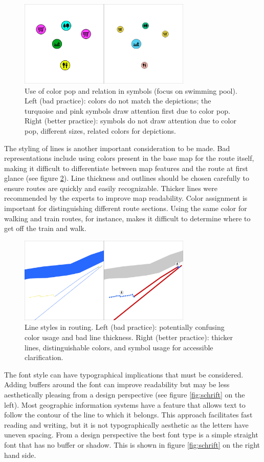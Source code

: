 \documentclass[agile, final]{copernicus-agile}
\begin{document}
\begin{figure}[ht]
  \includegraphics[width=8.2cm]{figures/symbole.png}
\caption{Use of color pop and relation in symbols (focus on swimming pool). Left (bad practice): colors do not match the depictions; the turquoise and pink symbols draw attention first due to color pop. Right (better practice): symbols do not draw attention due to color pop, different sizes, related colors for depictions.}
\label{fig:symbole}
\end{figure}

The styling of lines is another important consideration to be made. Bad representations include using colors present in the base map for the route itself, making it difficult to differentiate between map features and the route at first glance (see figure \ref{fig:linien_farbe}). Line thickness and outlines should be chosen carefully to ensure routes are quickly and easily recognizable. Thicker lines were recommended by the experts to improve map readability. Color assignment is important for distinguishing different route sections. Using the same color for walking and train routes, for instance, makes it difficult to determine where to get off the train and walk. 

\begin{figure}[ht]
  \includegraphics[width=8.2cm]{figures/linien_farbe.png}
\caption{Line styles in routing. Left (bad practice): potentially confusing color usage and bad line thickness. Right (better practice): thicker lines, distinguishable colors, and symbol usage for accessible clarification.}
\label{fig:linien_farbe}
\end{figure}

The font style can have typographical implications that must be considered. Adding buffers around the font can improve readability but may be less aesthetically pleasing from a design perspective (see figure \ref{fig:schrift} on the left). Most geographic information systems have a feature that allows text to follow the contour of the line to which it belongs. This approach facilitates fast reading and writing, but it is not typographically aesthetic as the letters have uneven spacing. From a design perspective the best font type is a simple straight font that has no buffer or shadow. This is shown in figure \ref{fig:schrift} on the right hand side.
\end{document}
